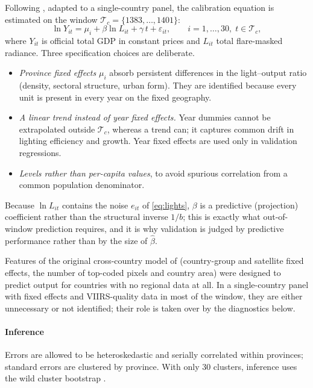\documentclass[11pt,a4paper]{article}
\begin{document}
Following \citet{LessmannSeidel2017}, adapted to a single-country panel, the calibration equation is estimated on the window $\mathcal{T}_c=\{1383,\ldots,1401\}$:
\begin{equation}
\ln Y_{it} = \mu_i + \beta \ln L_{it} + \gamma\, t + \varepsilon_{it}, \qquad i=1,\ldots,30,\; t\in\mathcal{T}_c,
\label{eq:calib}
\end{equation}
where $Y_{it}$ is official total GDP in constant prices and $L_{it}$ total flare-masked radiance. Three specification choices are deliberate.

\begin{itemize}
\item \emph{Province fixed effects} $\mu_i$ absorb persistent differences in the light--output ratio (density, sectoral structure, urban form). They are identified because every unit is present in every year on the fixed geography.
\item \emph{A linear trend instead of year fixed effects.} Year dummies cannot be extrapolated outside $\mathcal{T}_c$, whereas a trend can; it captures common drift in lighting efficiency and growth. Year fixed effects are used only in validation regressions.
\item \emph{Levels rather than per-capita values}, to avoid spurious correlation from a common population denominator.
\end{itemize}
Because $\ln L_{it}$ contains the noise $e_{it}$ of \eqref{eq:lights}, $\beta$ is a predictive (projection) coefficient rather than the structural inverse $1/b$; this is exactly what out-of-window prediction requires, and it is why validation is judged by predictive performance rather than by the size of $\hat\beta$.

Features of the original cross-country model of \citet{LessmannSeidel2017} (country-group and satellite fixed effects, the number of top-coded pixels and country area) were designed to predict output for countries with no regional data at all. In a single-country panel with fixed effects and VIIRS-quality data in most of the window, they are either unnecessary or not identified; their role is taken over by the diagnostics below.

\paragraph{Inference}
Errors are allowed to be heteroskedastic and serially correlated within provinces; standard errors are clustered by province. With only 30 clusters, inference uses the wild cluster bootstrap \citep{Cameron2008}.
\end{document}
